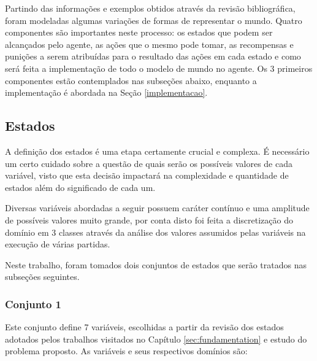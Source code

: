 Partindo das informações e exemplos obtidos através da revisão bibliográfica,
foram modeladas algumas variações de formas de representar o mundo. Quatro
componentes são importantes neste processo: os estados que podem ser alcançados
pelo agente, as ações que o mesmo pode tomar, as recompensas e punições a serem
atribuídas para o resultado das ações em cada estado e como será feita a
implementação de todo o modelo de mundo no agente. Os 3 primeiros componentes
estão contemplados nas subseções abaixo, enquanto a implementação é abordada na Seção
\ref{implementacao}.

\subsection{Estados}\label{states}

A definição dos estados é uma etapa certamente crucial e complexa.
É necessário um certo cuidado sobre a questão de quais serão os possíveis valores
de cada variável, visto que esta decisão impactará na complexidade e
quantidade de estados além do significado de cada um.

Diversas variáveis abordadas a seguir possuem
caráter contínuo e uma amplitude de possíveis valores muito grande, por conta
disto foi feita a discretização do domínio em 3 classes através da análise
dos valores assumidos pelas variáveis na execução de várias partidas.

Neste trabalho, foram tomados dois conjuntos de estados que serão tratados nas
subseções seguintes.

\subsubsection{Conjunto 1}

Este conjunto define 7 variáveis, escolhidas a partir da revisão dos estados
adotados pelos trabalhos visitados no Capítulo \ref{sec:fundamentation} e estudo
do problema proposto. As variáveis e seus respectivos domínios são:

